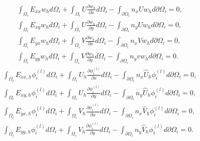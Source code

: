 \documentclass[11pt]{article}
\begin{document}
\begin{align}
\int_{\Omega_i}E_{xx} w_h d\Omega_i + \int_{\Omega_i} U \frac{\partial w_h}{\partial x} d\Omega_i - \int_{\partial\Omega_i}n_x Uw_h d\partial\Omega_i= 0, \\
\int_{\Omega_i}E_{xy} w_h d\Omega_i + \int_{\Omega_i} U \frac{\partial w_h}{\partial y} d\Omega_i - \int_{\partial\Omega_i}n_y Uw_h d\partial\Omega_i= 0, \\
\int_{\Omega_i}E_{yx} w_h d\Omega_i + \int_{\Omega_i} V \frac{\partial w_h}{\partial x} d\Omega_i - \int_{\partial\Omega_i}n_x Vw_h d\partial\Omega_i= 0, \\
\int_{\Omega_i}E_{yy} w_h d\Omega_i + \int_{\Omega_i} V \frac{\partial w_h}{\partial y} d\Omega_i - \int_{\partial\Omega_i}n_y vw_h d\partial\Omega_i= 0.
\end{align}
\begin{align}
\int_{\Omega_i}E_{xx,h} \phi_i^{(l)} d\Omega_i + \int_{\Omega_i} U_h \frac{\partial \phi_i^{(l)}}{\partial x} d\Omega_i - \int_{\partial\Omega_i}n_x \widehat{U}_h\phi_i^{(l)} d\partial\Omega_i= 0, \\
\int_{\Omega_i}E_{xy,h} \phi_i^{(l)} d\Omega_i + \int_{\Omega_i} U_h \frac{\partial \phi_i^{(l)}}{\partial y} d\Omega_i - \int_{\partial\Omega_i}n_y \widehat{U}_h\phi_i^{(l)} d\partial\Omega_i= 0, \\
\int_{\Omega_i}E_{yx,h} \phi_i^{(l)} d\Omega_i + \int_{\Omega_i} V_h \frac{\partial \phi_i^{(l)}}{\partial x} d\Omega_i - \int_{\partial\Omega_i}n_x \widehat{V}_h\phi_i^{(l)} d\partial\Omega_i= 0, \\
\int_{\Omega_i}E_{yy,h} \phi_i^{(l)} d\Omega_i + \int_{\Omega_i} V_h \frac{\partial \phi_i^{(l)}}{\partial y} d\Omega_i - \int_{\partial\Omega_i}n_y \widehat{V}_h\phi_i^{(l)} d\partial\Omega_i= 0.
\end{align}
\end{document}
